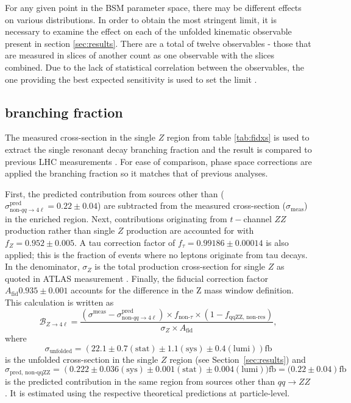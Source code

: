 For any given point in the BSM parameter space, there may be different effects on various distributions. In order to obtain the most stringent limit, it is necessary to examine the effect on each of the unfolded kinematic observable present in section \ref{sec:results}. There are a total of twelve observables - those that are measured in slices of another count as one observable with the slices combined. Due to the lack of statistical correlation between the observables, the one providing the best expected sensitivity is used to set the limit \cite{m4l2021_paper}.

\subsection{\ZFourL branching fraction}
The measured cross-section in the single $Z$ region from table \ref{tab:fidxs} is used to extract the single resonant \ZFourL decay branching fraction and the result is compared to previous LHC measurements \cite{3 missing citations}. For ease of comparison, phase space corrections are applied the branching fraction so it matches that of previous analyses. 

First, the predicted contribution from sources other than \qqFourL{} ($\sigma_{\text{non-}qq\to 4\ell}^{\text{pred}}=0.22\pm0.04$) are subtracted from the measured cross-section ($\sigma_{\text{meas}}$) in the \ZFourL enriched region. Next, contributions originating from $t-$channel $ZZ$ production rather than single $Z$ production are accounted for with $f_{Z}=0.952\pm0.005$. A tau correction factor of $f_{\tau}=0.99186\pm0.00014$ is also applied; this is the fraction of events where no leptons originate from tau decays. In the denominator, $\sigma_Z$ is the total production cross-section for single $Z$ as quoted in ATLAS measurement \cite{missing citation}. Finally, the fiducial correction factor $A_{\text{fid}}0.935 \pm 0.001$ accounts for the difference in the Z mass window definition. This calculation is written as
\begin{equation*}
    \mathcal{B}_{Z\rightarrow 4\ell} = \frac{\left(\sigma^{\text{meas}}-\sigma_{\text{non-}qq\to 4\ell}^{\text{pred}}\right) \times f_{\text{non-}\tau} \times (1-f_{\text{qqZZ, non-res}})}{\sigma_{Z} \times A_{\text{fid}}},
\end{equation*}
where 
\begin{equation*}
    \sigma_{\text{unfolded}} = \left(22.1 \pm 0.7(\text{stat}) \pm 1.1(\text{sys}) \pm 0.4 (\text{lumi})  \right)\text{fb} 
\end{equation*}
is the unfolded cross-section in the single $Z$ region (see Section~\ref{sec:results}) and  
\begin{equation*}
    \sigma_{\text{pred, non-qqZZ}} =  \left(0.222 \pm 0.036(\text{sys}) \pm 0.001 (\text{stat}) \pm 0.004 (\text{lumi}))\text{fb} = (0.22\pm 0.04 \right) \text{fb}
\end{equation*}
is the predicted contribution in the same region from sources other than $qq\to ZZ$. It is estimated using the respective theoretical predictions at particle-level. 

